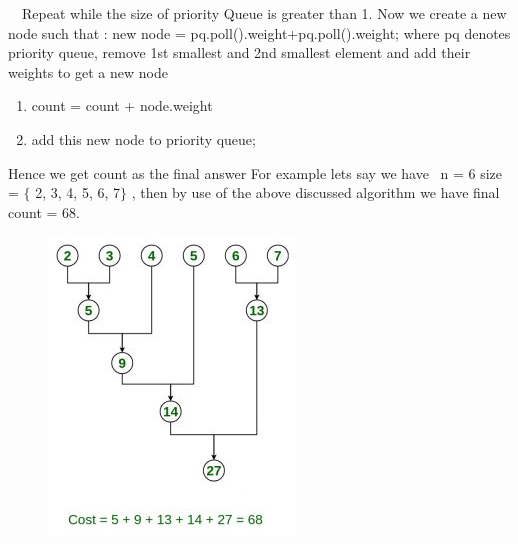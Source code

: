 \documentclass[10pt]{report}
\begin{document}
\begin{multicols}{2}
\vspace{\baselineskip}

\vspace{\baselineskip}

\vspace{\baselineskip}

\vspace{\baselineskip}

\vspace{\baselineskip}

\vspace{\baselineskip}
\ \  
\textcolor[HTML]{40424E}{Repeat while the size of priority Queue is greater than 1. Now we create a new node such that :}
\textcolor[HTML]{40424E}{new node = pq.poll().weight+pq.poll().weight;}
\textcolor[HTML]{40424E}{where pq denotes priority queue, remove 1st smallest and 2nd smallest element and add their weights to get a new node}
\begin{enumerate}
	\item \textcolor[HTML]{40424E}{count = count + node.weight}
	\item \textcolor[HTML]{40424E}{add this new node to priority queue;}
\end{enumerate}
\textcolor[HTML]{40424E}{Hence we get count as the final answer}
\textcolor[HTML]{40424E}{For example lets say we have  n = 6 }
\textcolor[HTML]{40424E}{size = $ \{ $ 2, 3, 4, 5, 6, 7$ \} $ , then by use of the above discussed algorithm we have final count = 68.}

\vspace{\baselineskip}



\begin{figure}[H]
	\begin{Center}
		\includegraphics[width=2.59in,height=3.12in]{./media/image1.jpeg}
	\end{Center}
\end{figure}



\end{multicols}
\end{document}
